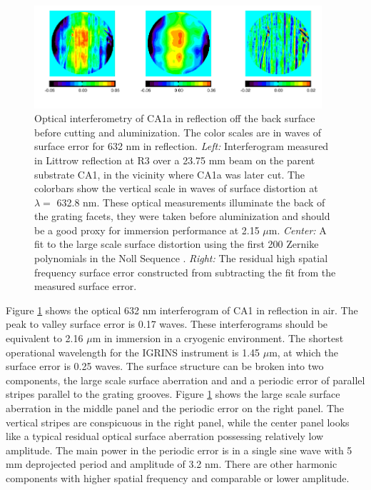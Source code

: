 \begin{figure}
  \centering
\includegraphics[width=0.95\textwidth]{chSPIE_2012_CA1/figs/CA1a_fig_scl2}
  \caption[Optical interferometry of the IGRINS immersion grating]{Optical interferometry of CA1a in reflection off the back surface before cutting and aluminization.  The color scales are in waves of surface error for 632 nm in reflection.  \emph{Left:} Interferogram measured in Littrow reflection at R3 over a 23.75 mm beam on the parent substrate CA1, in the vicinity where CA1a was later cut.  The colorbars show the vertical scale in waves of surface distortion at $\lambda = $ 632.8 nm.  These optical measurements illuminate the back of the grating facets, they were taken before aluminization and should be a good proxy for immersion performance at 2.15 $\mu$m. \emph{Center:} A fit to the large scale surface distortion using the first 200 Zernike polynomials in the Noll Sequence \cite{noll1976}.  \emph{Right:} The residual high spatial frequency surface error constructed from subtracting the fit from the measured surface error.}
  \label{fig:gram}
\end{figure}

Figure \ref{fig:gram} shows the optical 632 nm interferogram of CA1 in reflection in air.  The peak to valley surface error is 0.17 waves.  These interferograms should be equivalent to 2.16 $\mu$m in immersion in a cryogenic environment.  The shortest operational wavelength for the IGRINS instrument is 1.45 $\mu$m, at which the surface error is 0.25 waves.  The surface structure can be broken into two components, the large scale surface aberration and and a periodic error of parallel stripes parallel to the grating grooves.  Figure \ref{fig:gram} shows the large scale surface aberration in the middle panel and the periodic error on the right panel.  The vertical stripes are conspicuous in the right panel, while the center panel looks like a typical residual optical surface aberration possessing relatively low amplitude.  The main power in the periodic error is in a single sine wave with 5 mm deprojected period and amplitude of 3.2 nm.  There are other harmonic components with higher spatial frequency and comparable or lower amplitude.  

